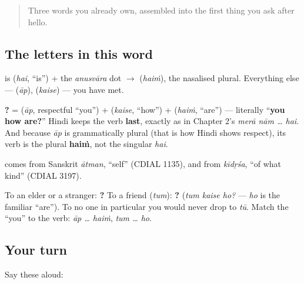 \label{lesson:HI-C03-aap-kaise-hain}



\begin{quote}
Three words you already own, assembled into the first thing you ask after hello.
\end{quote}

\subsection*{The letters in this word}
\textbf{} is \textbf{} (\emph{hai}, \textquotedblleft{}is\textquotedblright{}) + the \emph{anusvāra} dot \textbf{} $\to$ \textbf{} (\emph{haiṁ}), the nasalised plural. Everything else — \textbf{} (\emph{āp}), \textbf{} (\emph{kaise}) — you have met.

\begin{cousinweb}
\textbf{  ?} = \textbf{} (\emph{āp}, respectful \textquotedblleft{}you\textquotedblright{}) + \textbf{} (\emph{kaise}, \textquotedblleft{}how\textquotedblright{}) + \textbf{} (\emph{haiṁ}, \textquotedblleft{}are\textquotedblright{}) — literally \textquotedblleft{}\textbf{you how are?}\textquotedblright{} Hindi keeps the verb \textbf{last}, exactly as in Chapter 2's \emph{merā nām … hai}. And because \emph{āp} is grammatically plural (that is how Hindi shows respect), its verb is the plural \textbf{haiṁ}, not the singular \emph{hai}.

\textbf{} comes from Sanskrit \emph{ātman}, \textquotedblleft{}self\textquotedblright{} (CDIAL 1135), and \textbf{} from \emph{kīdṛśa}, \textquotedblleft{}of what kind\textquotedblright{} (CDIAL 3197).
\end{cousinweb}

\begin{grammarlens}[title={Grammar Lens: respect is plural}]
To an elder or a stranger: \textbf{  ?} To a friend (\emph{tum}): \textbf{  ?} (\emph{tum kaise ho?} — \emph{ho} is the familiar \textquotedblleft{}are\textquotedblright{}). To no one in particular you would never drop to \emph{tū}. Match the \textquotedblleft{}you\textquotedblright{} to the verb: \emph{āp … haiṁ}, \emph{tum … ho}.
\end{grammarlens}

\subsection*{Your turn}
Say these aloud:

